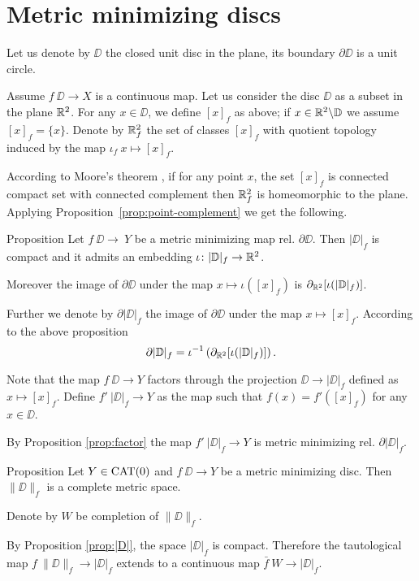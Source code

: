 \documentclass[a4paper,10pt]{amsart}
\begin{document}
\section{Metric minimizing discs}



Let us denote by $\DD$ the closed unit disc in the plane,
its boundary $\partial \DD$ is a unit circle.

Assume $f\:\DD\to X$ is a continuous map.
Let us consider the disc $\DD$ as a subset in the plane $\mathbb{R}^2$.
For any $x\in \DD$, we define $[x]_f$ as above;
if $x\in \mathbb{R}^2\backslash \mathbb{D}$ we assume $[x]_f=\{x\}$.
Denote by $\mathbb{R}^2_f$ the set of classes $[x]_f$ with quotient topology induced by the map $\iota_f\:x\mapsto [x]_f$.

According to Moore's theorem \cite{moore},
if for any point $x$, the set $[x]_f$ is connected compact set with connected complement
then $\mathbb{R}^2_f$ is homeomorphic to the plane.
Applying Proposition~\ref{prop:point-complement} we get the following.

\begin{thm}{Proposition}\label{prop:|D|}
Let $f\:\DD\to\ Y$ be a metric minimizing map rel. $\partial \DD$.
Then $|\DD|_f$ is compact and it admits an embedding $\iota\colon|\mathbb{D}|_f\to \mathbb{R}^2$.

Moreover the image of $\partial \DD$
under the map $x\mapsto \iota([x]_f)$
is $\partial_{\mathbb{R}^2}[\iota(|\mathbb{D}|_f)]$.
\end{thm}

Further we denote by $\partial|\DD|_f$ the image of $\partial \DD$
under the map $x\mapsto [x]_f$.
According to the above proposition 
\[\partial|\mathbb{D}|_f=\iota^{-1}\left(\partial_{\mathbb{R}^2}[\iota(|\mathbb{D}|_f)]\right).\]

Note that the map $f\:\DD\to Y$ factors through the projection 
$\DD\to|\DD|_f$ defined as $x\mapsto[x]_f$.
Define $f'\:|\DD|_f\to Y$ as the map such that $f(x)=f'([x]_f)$ for any $x\in\DD$.

By Proposition \ref{prop:factor} the map $f'\:|\DD|_f\to Y$
is metric minimizing rel. $\partial|\DD|_f$.

\begin{thm}{Proposition}
Let $Y\in\mathop{\rm CAT}\nolimits(0)$ 
and 
$f\:\DD\to Y$ be a metric minimizing disc.
Then $\|\DD\|_f$ is a complete metric space.
\end{thm}

Denote by $W$ be completion of $\|\DD\|_f$.

By Proposition \ref{prop:|D|},
the space $|\DD|_f$ is compact.
Therefore the tautological map $f\:\|\DD\|_f\to |\DD|_f$ 
extends to a continuous map $\bar f\:W\to |\DD|_f$.
\end{document}

